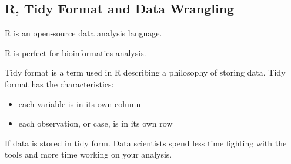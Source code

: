 \subsection{R, Tidy Format and Data Wrangling}
R is an open-source data analysis language.

R is perfect for bioinformatics analysis.

Tidy format is a term used in R describing a philosophy of storing data. Tidy format has the characteristics:
\begin{itemize}
	\item each variable is in its own column
	\item each observation, or case, is in its own row
\end{itemize}

If data is stored in tidy form. Data scientists spend less time fighting with the tools and more time working on your analysis.

